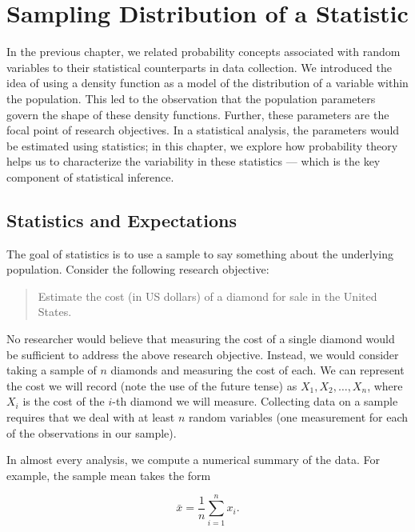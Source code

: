 \documentclass[
  letterpaper,
  DIV=11,
  numbers=noendperiod]{scrreprt}
\theoremstyle{plain}
\theoremstyle{definition}
\theoremstyle{definition}
\theoremstyle{remark}
\begin{document}

\hypertarget{sec-samplingdistributions}{%
\chapter{Sampling Distribution of a
Statistic}\label{sec-samplingdistributions}}

In the previous chapter, we related probability concepts associated with
random variables to their statistical counterparts in data collection.
We introduced the idea of using a density function as a model of the
distribution of a variable within the population. This led to the
observation that the population parameters govern the shape of these
density functions. Further, these parameters are the focal point of
research objectives. In a statistical analysis, the parameters would be
estimated using statistics; in this chapter, we explore how probability
theory helps us to characterize the variability in these statistics ---
which is the key component of statistical inference.

\hypertarget{statistics-and-expectations}{%
\section{Statistics and
Expectations}\label{statistics-and-expectations}}

The goal of statistics is to use a sample to say something about the
underlying population. Consider the following research objective:

\begin{quote}
Estimate the cost (in US dollars) of a diamond for sale in the United
States.
\end{quote}

No researcher would believe that measuring the cost of a single diamond
would be sufficient to address the above research objective. Instead, we
would consider taking a sample of \(n\) diamonds and measuring the cost
of each. We can represent the cost we will record (note the use of the
future tense) as \(X_1, X_2, \dotsc, X_n\), where \(X_i\) is the cost of
the \(i\)-th diamond we will measure. Collecting data on a sample
requires that we deal with at least \(n\) random variables (one
measurement for each of the observations in our sample).

In almost every analysis, we compute a numerical summary of the data.
For example, the sample mean takes the form

\[\bar{x} = \frac{1}{n} \sum_{i=1}^{n} x_i.\]
\end{document}
